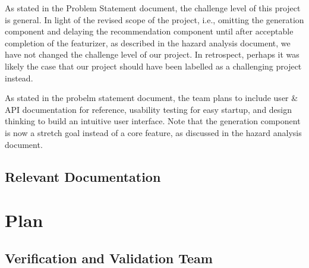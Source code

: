 \documentclass[12pt, titlepage]{article}
\begin{document}
\begin{description}[leftmargin=0cm]
  \item[Challenge Level] As stated in the Problem Statement document, the challenge level of this project is general. In light of the revised scope of the project, i.e., omitting the generation component and delaying the recommendation component until after acceptable completion of the featurizer, as described in the hazard analysis document, we have not changed the challenge level of our project. In retrospect, perhaps it was likely the case that our project should have been labelled as a challenging project instead.
  \item[Extras] As stated in the probelm statement document, the team plans to include user \& API documentation for reference, usability testing for easy startup, and design thinking to build an intuitive user interface. Note that the generation component is now a stretch goal instead of a core feature, as discussed in the hazard analysis document.
\end{description}

\subsection{Relevant Documentation}


\citet{SRS}


\section{Plan}


\subsection{Verification and Validation Team}
\end{document}
